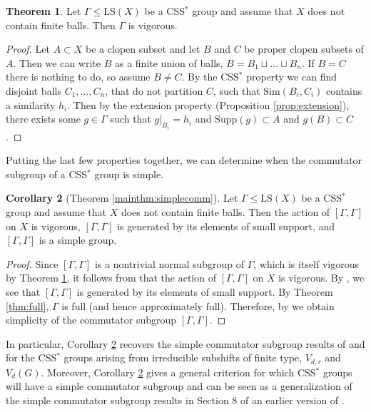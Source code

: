 \documentclass[12pt]{amsart}
\numberwithin{equation}{subsection}
\theoremstyle{definition}
\newtheorem{theorem}{Theorem}[section]
\newtheorem{corollary}[theorem]{Corollary}
\theoremstyle{definition}
\theoremstyle{remark}
\newcommand{\supp}{\text{Supp}}
\begin{document}
\begin{theorem}\label{thm:vigorous}
    Let $\Gamma \leq \text{LS}(X)$ be a CSS$^*$ group and assume that $X$ does not contain finite balls. Then $\Gamma$ is vigorous.  
\end{theorem}

\begin{proof}
    Let $A \subset X$ be a clopen subset and let $B$ and $C$ be proper clopen subsets of $A$. Then we can write $B$ as a finite union of balls, $B = B_1 \sqcup \dots \sqcup B_n$. If $B = C$ there is nothing to do, so assume $B \neq C$. By the CSS$^*$ property we can find disjoint balls $C_1, \dots, C_n$, that do not partition $C$, such that $\text{Sim}(B_i,C_i)$ contains a similarity $h_i$. Then by the extension property (Proposition \ref{prop:extension}), there exists some $g \in \Gamma$ such that $g\vert_{B_i}=h_i$ and $\supp(g) \subset A$ and $g(B) \subset C$. 
    
\end{proof}

Putting the last few properties together, we can determine when the commutator subgroup of a CSS$^*$ group is simple. 

\begin{corollary}[Theorem \ref{mainthm:simplecomm}]\label{cor:simplecomm}
Let $\Gamma \leq \text{LS}(X)$ be a CSS$^*$ group and assume that $X$ does not contain finite balls. Then the action of $[\Gamma , \Gamma ]$ on $X$ is vigorous, $[\Gamma, \Gamma ]$ is generated by its elements of small support, and $[\Gamma , \Gamma ]$ is a simple group.
\end{corollary}

\begin{proof}
Since $[\Gamma , \Gamma]$ is a nontrivial normal subgroup of $\Gamma$, which is itself vigorous by Theorem \ref{thm:vigorous}, it follows from \cite[Lemma 4.14]{BleakEtAll2023} that the action of $[\Gamma , \Gamma]$ on $X$ is vigorous. By \cite[Lemma 4.15]{BleakEtAll2023}, we see that $[\Gamma, \Gamma ]$ is generated by its elements of small support. By Theorem \ref{thm:full}, $\Gamma$ is full (and hence approximately full). Therefore, by \cite[Lemma 4.17]{BleakEtAll2023} we obtain simplicity of the commutator subgroup $[\Gamma , \Gamma ]$.

\end{proof}

In particular, Corollary \ref{cor:simplecomm} recovers the simple commutator subgroup results of \cite{Matui20215SFT} and \cite{BleakEtAll2023} for the CSS$^*$ groups arising from irreducible subshifts of finite type, $V_{d,r}$ and $V_d(G)$. Moreover, Corollary \ref{cor:simplecomm} gives a general criterion for which CSS$^*$ groups will have a simple commutator subgroup and can be seen as a generalization of the simple commutator subgroup results in Section 8 of an earlier version of \cite{FarleyHughes15}. 
\end{document}

